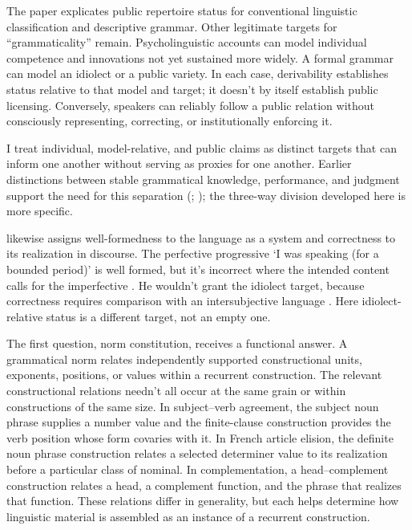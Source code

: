 \documentclass[12pt,letterpaper]{article}
\begin{document}
The paper explicates public repertoire status for conventional linguistic
classification and descriptive grammar. Other legitimate targets for \enquote{grammaticality}
remain. Psycholinguistic accounts can model individual
competence and innovations not yet sustained more widely. A formal grammar can
model an idiolect or a public variety. In each case, derivability establishes
status relative to that model and target; it doesn't by itself establish public
licensing. Conversely, speakers can
reliably follow a public relation without consciously representing, correcting,
or institutionally enforcing it.

I treat individual, model-relative,
and public claims as distinct targets that can inform one another without serving
as proxies for one another. Earlier distinctions between stable grammatical
knowledge, performance, and judgment support the need for this separation
(\citealp[4--6, 16--17]{poulsen2012grammaticality};
\citealp[1--6]{leivadawestergaard2020});
the three-way division developed here is more specific.

\textcite[95--96]{coseriu2019} likewise assigns well-formedness to the language as
a system and correctness to its realization in discourse. The perfective
progressive  `I was speaking (for a bounded period)' is well
formed, but it's incorrect where the intended content calls for the imperfective
. He wouldn't grant the idiolect target, because
correctness requires comparison with an intersubjective language
\citep[98]{coseriu2019}. Here idiolect-relative status is a different target, not
an empty one.

The first question, norm constitution, receives a functional answer. A grammatical
norm relates independently supported constructional units, exponents, positions,
or values within a recurrent construction. The relevant constructional relations
needn't all occur at the same grain or within constructions of the same size. In
subject--verb agreement, the subject noun phrase
supplies a number value and the finite-clause construction provides the verb
position whose form covaries with it. In French article elision, the definite noun
phrase construction relates a selected determiner value to its realization before
a particular class of nominal. In complementation, a head--complement construction
relates a head, a complement function, and the phrase that realizes that function.
These relations differ in generality, but each helps determine how linguistic
material is assembled as an instance of a recurrent construction.
\end{document}
